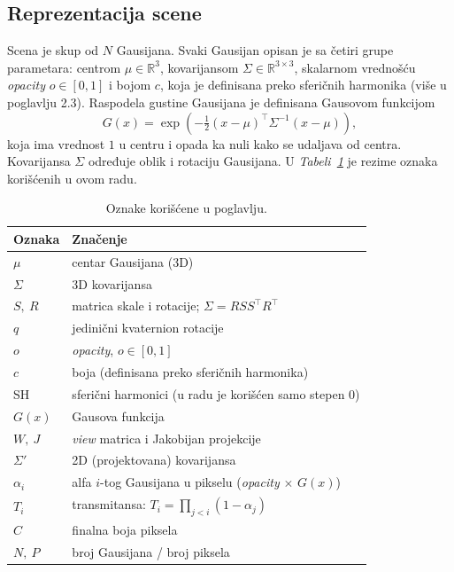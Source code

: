 \documentclass[12pt]{article}
\begin{document}
   \subsection{Reprezentacija scene}

   Scena je skup od $N$ Gausijana. Svaki Gausijan opisan je sa četiri grupe
   parametara: centrom $\mu \in \mathbb{R}^3$, kovarijansom $\Sigma \in \mathbb{R}^{3\times3}$,
   skalarnom vrednošću \textit{opacity} $o \in [0, 1]$ i bojom $c$, koja je definisana preko sferičnih harmonika (više u poglavlju 2.3).
   Raspodela gustine Gausijana je definisana Gausovom funkcijom
   \begin{equation}\label{eq:gauss}
      G(x) = \exp\!\left(-\tfrac{1}{2}(x - \mu)^\top \Sigma^{-1} (x - \mu)\right),
   \end{equation}
   koja ima vrednost $1$ u centru i opada ka nuli kako se udaljava od centra. Kovarijansa
   $\Sigma$ određuje oblik i rotaciju Gausijana. U \textit{Tabeli~\ref{tab:notacija}}
   je rezime oznaka korišćenih u ovom radu.

   \begin{table}[H]
      \centering
      \begin{tabular}{ll}
         \hline
         Oznaka & Značenje \\
         \hline
         $\mu$ & centar Gausijana (3D) \\
         $\Sigma$ & 3D kovarijansa \\
         $S,\ R$ & matrica skale i rotacije; $\Sigma = R S S^\top R^\top$ \\
         $q$ & jedinični kvaternion rotacije \\
         $o$ & \textit{opacity}, $o \in [0,1]$ \\
         $c$ & boja (definisana preko sferičnih harmonika) \\
         SH & sferični harmonici (u radu je korišćen samo stepen 0) \\
         $G(x)$ & Gausova funkcija \\
         $W,\ J$ & \textit{view} matrica i Jakobijan projekcije \\
         $\Sigma'$ & 2D (projektovana) kovarijansa \\
         $\alpha_i$ & alfa $i$-tog Gausijana u pikselu (\textit{opacity} $\times$ $G(x)$) \\
         $T_i$ & transmitansa: $T_i = \prod_{j<i}(1-\alpha_j)$ \\
         $C$ & finalna boja piksela \\
         $N,\ P$ & broj Gausijana / broj piksela \\
         \hline
      \end{tabular}
      \caption{Oznake korišćene u poglavlju.}
      \label{tab:notacija}
   \end{table}
\end{document}
